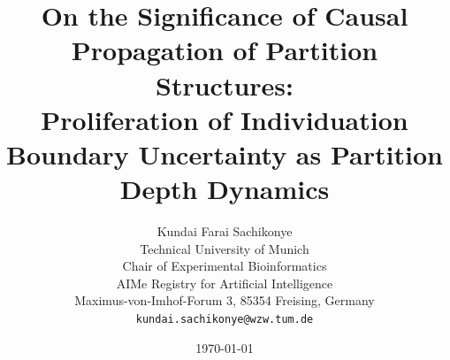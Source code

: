 \documentclass[11pt,twocolumn,a4paper]{article}
\theoremstyle{plain}
\theoremstyle{definition}
\theoremstyle{remark}
\begin{document}

\title{\textbf{On the Significance of Causal Propagation of Partition Structures: \\ Proliferation of Individuation Boundary Uncertainty as  Partition Depth Dynamics }}

\author{Kundai Farai Sachikonye\\[2pt]
\small Technical University of Munich \\
\small Chair of Experimental Bioinformatics\\
\small AIMe Registry for Artificial Intelligence\\
\small Maximus-von-Imhof-Forum 3, 85354 Freising, Germany\\
\small \texttt{kundai.sachikonye@wzw.tum.de}}

\date{\today}

\maketitle
\end{document}
